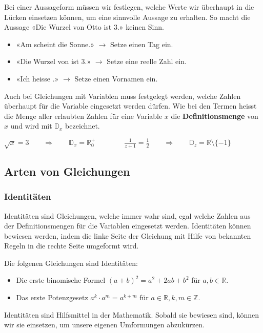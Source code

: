 Bei einer Aussageform müssen wir festlegen, welche Werte wir überhaupt in die Lücken einsetzen können, um eine sinnvolle Aussage zu erhalten. So macht die Aussage «Die Wurzel von Otto ist 3.» keinen Sinn.
\begin{example}
  \begin{itemize}[noitemsep]
    \item «Am \underline{\hspace{1cm}} scheint die Sonne.» $\rightarrow$ Setze einen Tag ein.
    \item «Die Wurzel von \underline{\hspace{1cm}} ist 3.» $\rightarrow$ Setze eine reelle Zahl ein.
    \item «Ich heisse \underline{\hspace{1cm}}.» $\rightarrow$ Setze einen Vornamen ein.
  \end{itemize}
\end{example}
Auch bei Gleichungen mit Variablen muss festgelegt werden, welche Zahlen überhaupt für die Variable eingesetzt werden dürfen. Wie bei den Termen heisst die Menge aller erlaubten Zahlen für eine Variable $x$ die \textbf{Definitionsmenge} von $x$ und wird mit $\mathbb{D}_{x}$ bezeichnet.
\begin{example}
  $\sqrt{x} = 3 \qquad\Rightarrow\qquad \mathbb{D}_{x} = \mathbb{R}_{0}^{+} \qquad\qquad
    \frac{1}{z+1} = \frac{1}{2} \qquad\Rightarrow\qquad \mathbb{D}_{z} = \mathbb{R}\setminus\{-1\}$
\end{example}

\subsection{Arten von Gleichungen}

\subsubsection{Identitäten}

Identitäten sind Gleichungen, welche immer wahr sind, egal welche Zahlen aus der Definitionsmengen für die Variablen eingesetzt werden. Identitäten können bewiesen werden, indem die linke Seite der Gleichung mit Hilfe von bekannten Regeln in die rechte Seite umgeformt wird.
\begin{example}
  Die folgenen Gleichungen sind Identitäten:
  \begin{itemize}
    \item Die erste binomische Formel $(a+b)^2= a^2+2ab+b^2$ für $a,b \in\mathbb{R}$.
    \item Das erste Potenzgesetz $a^k\cdot a^m = a^{k+m}$ für $a \in\mathbb{R}, k,m \in \mathbb{Z}$.
  \end{itemize}
\end{example}
Identitäten sind Hilfsmittel in der Mathematik. Sobald sie bewiesen sind, können wir sie einsetzen, um unsere eigenen Umformungen abzukürzen.

